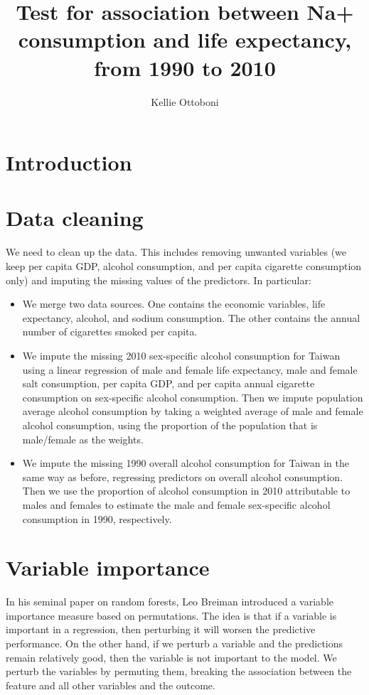 \documentclass[11pt]{article}\usepackage[]{graphicx}\usepackage[]{color}
\title{Test for association between Na+ consumption and life expectancy, from 1990 to 2010}
\author{Kellie Ottoboni}
\begin{document}
\maketitle
\section{Introduction}





\section{Data cleaning}

We need to clean up the data. This includes removing unwanted variables (we keep per capita GDP, alcohol consumption, and per capita cigarette consumption only) and imputing the missing values of the predictors. In particular:

\begin{itemize}
\item We merge two data sources. One contains the economic variables, life expectancy, alcohol, and sodium consumption. The other contains the annual number of cigarettes smoked per capita.
\item We impute the missing 2010 sex-specific alcohol consumption for Taiwan using a linear regression of male and female life expectancy, male and female salt consumption, per capita GDP, and per capita annual cigarette consumption on sex-specific alcohol consumption. Then we impute population average alcohol consumption by taking a weighted average of male and female alcohol consumption, using the proportion of the population that is male/female as the weights.
\item We impute the missing 1990 overall alcohol consumption for Taiwan in the same way as before, regressing predictors on overall alcohol consumption. Then we use the proportion of alcohol consumption in 2010 attributable to males and females to estimate the male and female sex-specific alcohol consumption in 1990, respectively.
\end{itemize}






\section{Variable importance}

In his seminal paper on random forests, Leo Breiman introduced a variable importance measure based on permutations. The idea is that if a variable is important in a regression, then perturbing it will worsen the predictive performance. On the other hand, if we perturb a variable and the predictions remain relatively good, then the variable is not important to the model. We perturb the variables by permuting them, breaking the association between the feature and all other variables and the outcome.
\end{document}
